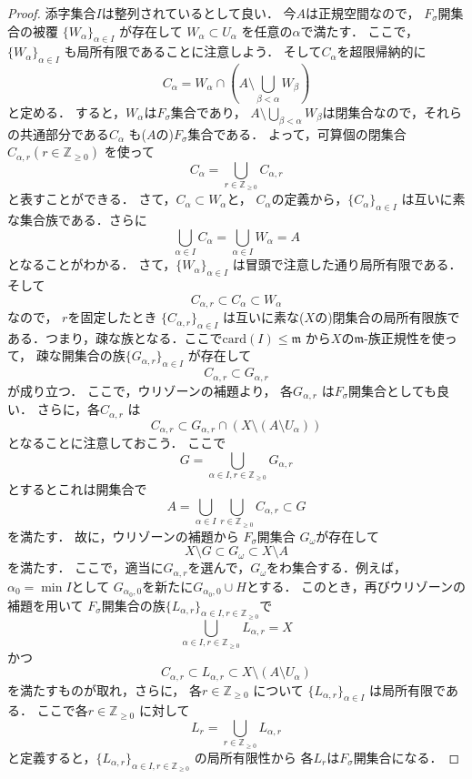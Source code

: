 \documentclass[leqno, a4paper, 12pt]{jsarticle}
\newcommand{\zz}{\mathbb{Z}}
\newcommand{\card}{\mathrm{card}}
\begin{document}
\begin{proof}
添字集合$I$は整列されているとして良い．
今$A$は正規空間なので，
$F_{\sigma}$開集合の被覆
$\{W_{\alpha}\}_{\alpha\in I}$
が存在して
$W_{\alpha}\subset U_{\alpha}$
を任意の$\alpha$で満たす．
ここで，$\{W_{\alpha}\}_{\alpha\in I}$
も局所有限であることに注意しよう．
そして$C_{\alpha}$を超限帰納的に
\[
C_{\alpha}=W_{\alpha}\cap\left(A\setminus \bigcup_{\beta<\alpha}W_{\beta}\right)
\]
と定める．
すると，$W_{\alpha}$は$F_{\sigma}$集合であり，
$A\setminus \bigcup_{\beta<\alpha}W_{\beta}$は閉集合なので，それらの共通部分である$C_{\alpha}$
も($A$の)$F_{\sigma}$集合である．
よって，可算個の閉集合$C_{\alpha, r} (r\in \zz_{\ge 0})$
を使って
\[
C_{\alpha}=\bigcup_{r\in \zz_{\ge 0}}C_{\alpha, r}
\]
と表すことができる．
さて，$C_{\alpha}\subset W_{\alpha}$と，
$C_{\alpha}$の定義から，$\{C_{\alpha}\}_{\alpha\in I}$
は互いに素な集合族である．さらに
\[
\bigcup_{\alpha\in I}C_{\alpha}=\bigcup_{\alpha\in I}W_{\alpha}=A
\]
となることがわかる．
さて，$\{W_{\alpha}\}_{\alpha\in I}$
は冒頭で注意した通り局所有限である．
そして 
\[
C_{\alpha, r}\subset C_{\alpha}\subset W_{\alpha}
\]
なので，
$r$を固定したとき
$\{C_{\alpha, r}\}_{\alpha\in I}$
は互いに素な($X$の)閉集合の局所有限族である．つまり，疎な族となる．ここで$\card(I)\le \mathfrak{m}$
から$X$の$\mathfrak{m}$-族正規性を使って，
疎な開集合の族$\{G_{\alpha, r}\}_{\alpha\in I}$
が存在して
\[
C_{\alpha, r}\subset G_{\alpha, r}
\]
が成り立つ．
ここで，ウリゾーンの補題より，
各$G_{\alpha, r}$
は$F_{\sigma}$開集合としても良い．
さらに，各$C_{\alpha, r}$
は
\[
C_{\alpha, r}\subset G_{\alpha, r}\cap (X\setminus (A\setminus U_{\alpha}))
\]
となることに注意しておこう．
ここで
\[
G=\bigcup_{\alpha\in I, r\in \zz_{\ge 0}}G_{\alpha, r}
\]
とするとこれは開集合で
\[
A= \bigcup_{\alpha\in I}\bigcup_{r\in \zz_{\ge 0}}C_{\alpha, r}\subset G
\]
を満たす．
故に，ウリゾーンの補題から
$F_{\sigma}$開集合
$G_{\omega}$が存在して
\[
X\setminus G\subset G_{\omega}\subset 
X\setminus A
\]
を満たす．
ここで，適当に$G_{\alpha, r}$を選んで，$G_{\omega}$をわ集合する．例えば，$\alpha_{0}=\min I$として
$G_{\alpha_{0}, 0}$を新たに$G_{\alpha_{0}, 0}\cup H$とする．
このとき，再びウリゾーンの補題を用いて
$F_{\sigma}$開集合の族$\{L_{\alpha, r}\}_{\alpha\in I, r\in \zz_{\ge 0}}$で
\[
\bigcup_{\alpha\in I, r\in \zz_{\ge 0}}L_{\alpha, r}=X
\]
かつ
\[
C_{\alpha, r}\subset L_{\alpha, r}\subset X\setminus (A\setminus U_{\alpha})
\]
を満たすものが取れ，さらに，
各$r\in \zz_{\ge 0}$
について
$\{L_{\alpha, r}\}_{\alpha\in I}$
は局所有限である．
ここで各$r\in \zz_{\ge 0}$
に対して
\[
L_{r}=\bigcup_{r\in \zz_{\ge 0}}L_{\alpha, r}
\]
と定義すると，$\{L_{\alpha, r}\}_{\alpha\in I, r\in \zz_{\ge 0}}$
の局所有限性から
各$L_{r}$は$F_{\sigma}$開集合になる．


\end{proof}
\end{document}
